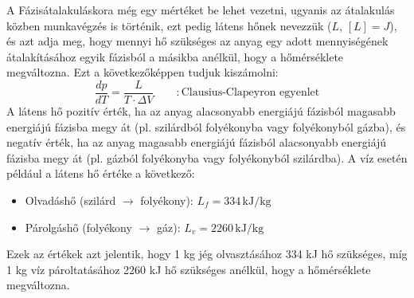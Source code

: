 \documentclass[../main.tex]{subfiles}
\begin{document}
A Fázisátalakuláskora még egy mértéket be lehet vezetni, ugyanis az átalakulás közben munkavégzés is történik, ezt pedig látens hőnek nevezzük ($L$, $\left[L\right] = J$), és azt adja meg, hogy
mennyi hő szükséges az anyag egy adott mennyiségének átalakításához egyik fázisból a másikba anélkül, hogy a hőmérséklete megváltozna.
Ezt a következőképpen tudjuk kiszámolni:
\begin{equation}
    \frac{dp}{dT} = \frac{L}{T \cdot \Delta V} \qquad : \text{Clausius-Clapeyron egyenlet}
\end{equation}
A látens hő pozitív érték, ha az anyag alacsonyabb energiájú fázisból magasabb energiájú fázisba megy át (pl. szilárdból folyékonyba vagy folyékonyból gázba),
és negatív érték, ha az anyag magasabb energiájú fázisból alacsonyabb energiájú fázisba megy át (pl. gázból folyékonyba vagy folyékonyból szilárdba). A víz esetén például
a látens hő értéke a következő:
\begin{itemize}
    \item Olvadáshő (szilárd $\to$ folyékony): $L_f = 334 \, \text{kJ/kg}$
    \item Párolgáshő (folyékony $\to$ gáz): $L_v = 2260 \, \text{kJ/kg}$
\end{itemize}
Ezek az értékek azt jelentik, hogy 1 kg jég olvasztásához 334 kJ hő szükséges, míg 1 kg víz pároltatásához 2260 kJ hő szükséges anélkül, hogy a hőmérséklete megváltozna.
\end{document}
